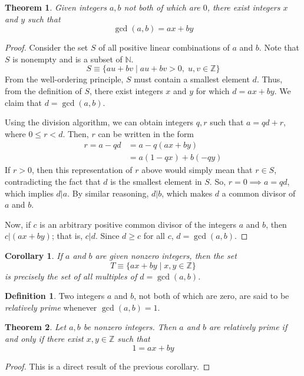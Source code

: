 \documentclass{article}
\newtheorem{theorem}{Theorem}[section]
\newtheorem{corollary}{Corollary}[theorem]
\theoremstyle{remark}
\theoremstyle{definition}
\newtheorem{definition}{Definition}[section]
\begin{document}
\begin{theorem}
Given integers $a, b$ not both of which are $0$, there exist integers $x$ and $y$ such that
\[\gcd(a, b) = a x + b y\]
\end{theorem}
\begin{proof}
Consider the set $S$ of all positive linear combinations of $a$ and $b$. Note that $S$ is nonempty and is a subset of $\mathbb{N}$. 
\[S \equiv \{ au + bv \;|\; au+bv > 0, \; u, v \in \mathbb{Z}\}\]
From the well-ordering principle, $S$ must contain a smallest element $d$. Thus, from the definition of $S$, there exist integers $x$ and $y$ for which $d = ax + by$. We claim that $d = \gcd(a, b)$. 

Using the division algorithm, we can obtain integers $q, r$ such that $a = qd + r$, where $0 \leq r < d$. Then, $r$ can be written in the form 
\begin{align*}
    r = a - qd & = a - q(ax + by) \\
    & = a(1 - qx) + b(-qy)
\end{align*}
If $r >0$, then this representation of $r$ above would simply mean that $r \in S$, contradicting the fact that $d$ is the smallest element in $S$. So, $r = 0 \implies a = qd$, which implies $d | a$. By similar reasoning, $d|b$, which makes $d$ a common divisor of $a$ and $b$. 

Now, if $c$ is an arbitrary positive common divisor of the integers $a$ and $b$, then $c | (ax+by)$; that is, $c|d$. Since $d \geq c$ for all $c$, $d = \gcd(a, b)$. 
\end{proof}

\begin{corollary}
If $a$ and $b$ are given nonzero integers, then the set
\[T \equiv \{ax + by \;|\; x, y \in \mathbb{Z}\}\]
is precisely the set of all multiples of $d = \gcd(a, b)$. 
\end{corollary}

\begin{definition}
Two integers $a$ and $b$, not both of which are zero, are said to be \textit{relatively prime} whenever $\gcd(a, b) = 1$. 
\end{definition}

\begin{theorem}
Let $a, b$ be nonzero integers. Then $a$ and $b$ are relatively prime if and only if there exist $x, y \in \mathbb{Z}$ such that
\[1 = a x + b y\]
\end{theorem}
\begin{proof}
This is a direct result of the previous corollary. 
\end{proof}
\end{document}
